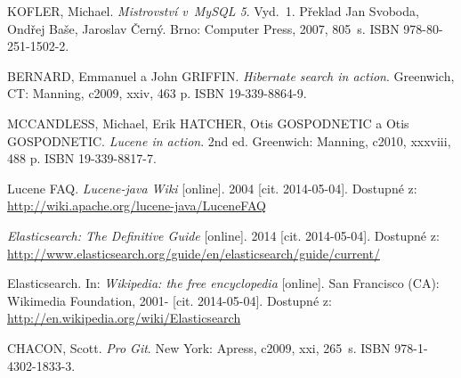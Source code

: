 \documentclass[11pt,oneside]{fithesis2}
\begin{document}
\begin{thebibliography}{1}

KOFLER, Michael. \textit{Mistrovství v~MySQL 5}. Vyd.~1. Překlad Jan Svoboda, Ondřej Baše, Jaroslav Černý. Brno: Computer Press, 2007, 805~s. ISBN 978-80-251-1502-2. 

BERNARD, Emmanuel a John GRIFFIN. \textit{Hibernate search in action}. Greenwich, CT: Manning, c2009, xxiv, 463 p. ISBN 19-339-8864-9. 

MCCANDLESS, Michael, Erik HATCHER, Otis GOSPODNETIC a Otis GOSPODNETIC. \textit{Lucene in action}. 2nd ed. Greenwich: Manning, c2010, xxxviii, 488 p. ISBN 19-339-8817-7. 

Lucene FAQ. \textit{Lucene-java Wiki} [online]. 2004 [cit. 2014-05-04]. Dostupné z: \url{http://wiki.apache.org/lucene-java/LuceneFAQ}

\textit{Elasticsearch: The Definitive Guide} [online]. 2014 [cit. 2014-05-04]. Dostupné z: \url{http://www.elasticsearch.org/guide/en/elasticsearch/guide/current/}

Elasticsearch. In: \textit{Wikipedia: the free encyclopedia} [online]. San Francisco (CA): Wikimedia Foundation, 2001- [cit. 2014-05-04]. Dostupné z: \url{http://en.wikipedia.org/wiki/Elasticsearch}

CHACON, Scott. \textit{Pro Git}. New York: Apress, c2009, xxi, 265~s. ISBN 978-1-4302-1833-3. 

\end{thebibliography}

\endgroup

\appendix

\end{document}

